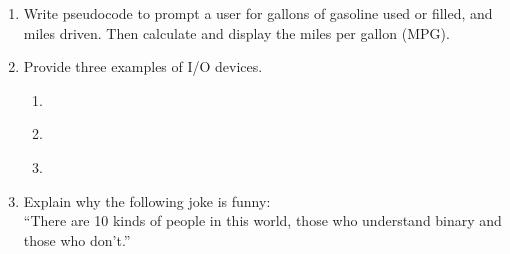 \documentclass[letter,11pt]{article}
\begin{document}
\begin{enumerate}
    \item Write pseudocode to prompt a user for gallons of gasoline used or filled, and miles driven. Then calculate and display the miles per gallon (MPG).
    
    \item Provide three examples of I/O devices.
    \begin{enumerate}
        \item ~~ ~~
        \item ~~ ~~
        \item ~~ ~~
    \end{enumerate}
    
    \item Explain why the following joke is funny: \\
    ``There are 10 kinds of people in this world, those who understand binary and those who don't.''
\end{enumerate}
\end{document}
